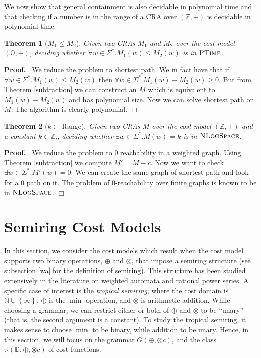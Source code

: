 \documentclass[11pt]{article}
\newtheorem{theorem}{Theorem}
\def\Proof{{\bf Proof.}}
\def\qed{{\bf $\Box$}}
\def\qed{{\bf $\Box$}}
\newcommand{\domain}{\ensuremath{\mathbb{D}}}
\newcommand{\Nat}{\ensuremath{\mathbb{N}}}
\newcommand{\Rat}{\ensuremath{\mathbb{Q}}}
\newcommand{\Int}{\ensuremath{\mathbb{Z}}}
\newcommand{\CG}{G}
\newcommand{\reg}[1]{{\mathbb R}(#1)}
\newcommand{\sradd}{\oplus}
\newcommand{\srmul}{\otimes}
\newcommand{\inputalph}{\ensuremath{\Sigma}}
\newcommand{\fm}[1]{\ensuremath{#1^{*}}}
\newcommand{\nlogspace}{\ensuremath{\sc\textsc{NLogSpace}}}
\newcommand{\ptime}{\ensuremath{\sc\textsc{PTime}}\xspace}
\newcommand{\edwa}{\ensuremath{M}}
\begin{document}
We now show that general containment is also decidable in polynomial
time and that checking if a number is in the range of a CRA over
$(\Int,+)$ is decidable in polynomial time.

\begin{theorem}[$\edwa_1\leq\edwa_2$]
Given two CRAs $\edwa_1$ and $\edwa_2$ over the cost model $(\Rat,+)$,
deciding whether $\forall w\in\fm\inputalph. \edwa_1(w)\leq\edwa_2(w)$
is in $\ptime$.
\end{theorem}
\Proof~
We reduce the problem to shortest path. We in fact have that if
$\forall w\in\fm\inputalph.\edwa_1(w)\leq\edwa_2(w)$ then $\forall
w\in\fm\inputalph.\edwa_1(w)-\edwa_2(w)\geq 0$. But from Theorem
\ref{subtraction} we can construct an $\edwa$ which is equivalent to
$\edwa_1(w)-\edwa_2(w)$ and has polynomial size. Now we can solve
shortest path on $\edwa$. The algorithm is clearly polynomial.
\qed

\begin{theorem}[$k\in$ Range]
Given two CRAs $\edwa$  over the cost model $(\Int,+)$ and a constant $k\in\Int$,,
deciding whether $\exists w\in\fm\inputalph. \edwa(w)=k$ is in $\nlogspace$.
\end{theorem}
\Proof~
We reduce the problem to 0 reachability in a weighted graph. Using Theorem \ref{subtraction} we compute $\edwa'=\edwa-c$.
Now we want to check $\exists w\in\fm\inputalph. \edwa'(w)=0$. We can create the same graph of shortest path
and look for a 0 path on it. The problem of $0$-reachability over finite graphs is known to be in $\nlogspace$.
\qed


\section{Semiring Cost Models}\label{sec:scm}


In this section, we consider the cost models which result when the
cost model supports two binary operations,
$\sradd$ and $\srmul$, that impose a semiring structure (see subsection \ref{wa} for the definition of semiring).
This structure has been studied extensively in the literature on weighted automata and rational power series.
A specific case of interest is the {\em tropical semiring\/},
where the cost domain is $\Nat\cup \left\{\infty\right\}$, $\sradd$ is the $\min$ operation, and $\srmul$ is arithmetic addition.
While choosing a grammar, we can restrict either or both of $\sradd$ and $\srmul$ to be ``unary''
(that is, the second argument is a constant).
To study the tropical semiring, it makes sense to choose $\min$ to be binary, while
addition to be unary. Hence, in this section, we will focus on the grammar $\CG(\sradd,\srmul c)$,
and the class $\reg{\domain,\sradd,\srmul c}$ of cost functions.
\end{document}

